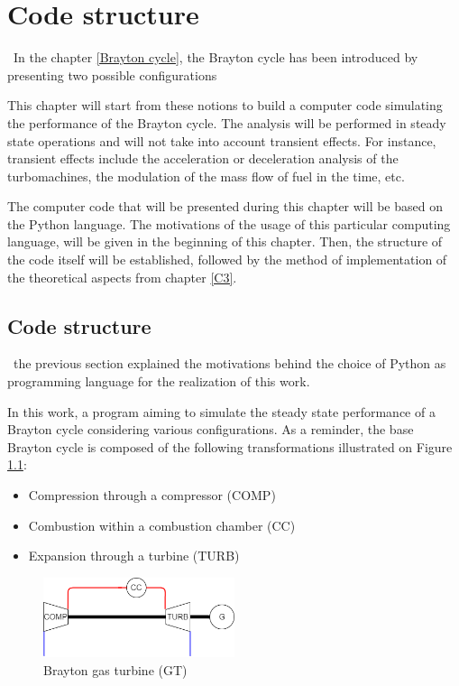\graphicspath{{Chapter_5_-_Code_structure/Images/}}
\chapter{Code structure}
\quad\, In the chapter \ref{Brayton cycle}, the Brayton cycle has been introduced by presenting two possible configurations 

This chapter will start from these notions to build a computer code simulating the performance of the Brayton cycle. The analysis will be performed in steady state operations and will not take into account transient effects. For instance, transient effects include the acceleration or deceleration analysis of the turbomachines, the modulation of the mass flow of fuel in the time, etc.

The computer code that will be presented during this chapter will be based on the Python language\citep{van1995python}. The motivations of the usage of this particular computing language, will be given in the beginning of this chapter. Then, the structure of the code itself will be established, followed by the method of implementation of the theoretical aspects from chapter \ref{C3}.



\section{Code structure}
\quad\, the previous section explained the motivations behind the choice of Python as programming language for the realization of this work.

In this work, a program aiming to simulate the steady state performance of a Brayton cycle considering various configurations. As a reminder, the base Brayton cycle is composed of the following transformations illustrated on Figure \ref{fig:C4_Brayton}:

\begin{itemize}
\item Compression through a compressor (COMP)
\item Combustion within a combustion chamber (CC)
\item Expansion through a turbine (TURB)
\end{itemize}

\begin{figure}[h]
\centering
\includegraphics[width=0.5\textwidth]{GT}
\caption{Brayton gas turbine (GT)}
\label{fig:C4_Brayton}
\end{figure}


